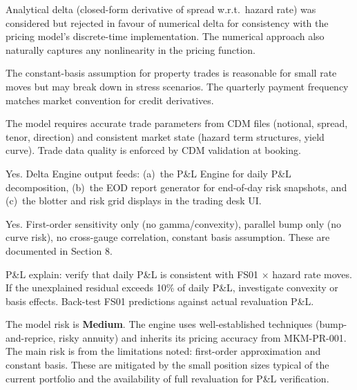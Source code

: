 \documentclass[11pt,a4paper]{article}
\begin{document}

Analytical delta (closed-form derivative of spread w.r.t.\ hazard rate) was considered but rejected in favour of numerical delta for consistency with the pricing model's discrete-time implementation. The numerical approach also naturally captures any nonlinearity in the pricing function.


The constant-basis assumption for property trades is reasonable for small rate moves but may break down in stress scenarios. The quarterly payment frequency matches market convention for credit derivatives.


The model requires accurate trade parameters from CDM files (notional, spread, tenor, direction) and consistent market state (hazard term structures, yield curve). Trade data quality is enforced by CDM validation at booking.


Yes. Delta Engine output feeds: (a)~the P\&L Engine for daily P\&L decomposition, (b)~the EOD report generator for end-of-day risk snapshots, and (c)~the blotter and risk grid displays in the trading desk UI.


Yes. First-order sensitivity only (no gamma/convexity), parallel bump only (no curve risk), no cross-gauge correlation, constant basis assumption. These are documented in Section 8.


P\&L explain: verify that daily P\&L is consistent with FS01 $\times$ hazard rate moves. If the unexplained residual exceeds 10\% of daily P\&L, investigate convexity or basis effects. Back-test FS01 predictions against actual revaluation P\&L.


The model risk is \textbf{Medium}. The engine uses well-established techniques (bump-and-reprice, risky annuity) and inherits its pricing accuracy from MKM-PR-001. The main risk is from the limitations noted: first-order approximation and constant basis. These are mitigated by the small position sizes typical of the current portfolio and the availability of full revaluation for P\&L verification.
\end{document}
